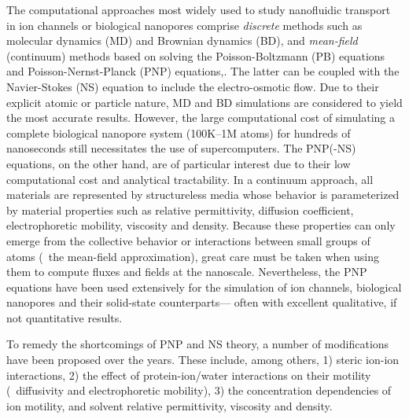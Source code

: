 \documentclass[journal=ancac3,manuscript=article,etalmode=truncate,maxauthors=0,layout=onecolumn]{achemso}
\begin{document}
The computational approaches most widely used to study nanofluidic transport in ion channels or biological
nanopores comprise \emph{discrete} methods such as molecular dynamics
(MD)\cite{Lynden-Bell-1996,Allen-1999,Aksimentiev-2005,Luan-2008,Bhattacharya-2011,Zhang-2014,DiMarino-2015,Belkin-2016}
and Brownian dynamics
(BD),\cite{Schirmer-1999,Im-2002,Noskov-2004,Millar-2008,Egwolf-2010,DeBiase-2015,Pederson-2015} and
\emph{mean-field} (continuum) methods based on solving the Poisson-Boltzmann (PB)
equations\cite{Grochowski-2008, Baldessari-2008-1} and Poisson-Nernst-Planck (PNP)
equations,\cite{Eisenberg-1996,Gillespie-2002, Simakov-2010}. The latter can be coupled with the Navier-Stokes
(NS) equation to include the electro-osmotic flow.\cite{Lu-2012,Pederson-2015} Due to their explicit atomic or
particle nature, MD and BD simulations are considered to yield the most accurate results. However, the large
computational cost of simulating a complete biological nanopore system (100K--1M atoms) for hundreds of
nanoseconds still necessitates the use of supercomputers.\cite{Aksimentiev-2005,Bhattacharya-2011} The
PNP(-NS) equations, on the other hand, are of particular interest due to their low computational cost and
analytical tractability. In a continuum approach, all materials are represented by structureless media whose
behavior is parameterized by material properties such as relative permittivity, diffusion coefficient,
electrophoretic mobility, viscosity and density. Because these properties can only emerge from the collective
behavior or interactions between small groups of atoms (\ie~the mean-field approximation), great care must be
taken when using them to compute fluxes and fields at the nanoscale.\cite{Corry-2000,Collins-2012}
Nevertheless, the PNP equations have been used extensively for the simulation of ion
channels,\cite{Im-2002,Furini-2006,Liu-2015} biological
nanopores\cite{Simakov-2010,Pederson-2015,Aguilella-Arzo-2017,Simakov-2018} and their solid-state
counterparts\cite{Cervera-2005,White-2008,Chaudhry-2014,Laohakunakorn-2015}--- often with excellent
qualitative, if not quantitative results.\cite{Maffeo-2012,Thomas-2014,Kim-2015}

To remedy the shortcomings of PNP and NS theory, a number of modifications have been proposed over the years.
These include, among others, 1) steric ion-ion interactions, 2) the effect of protein-ion/water interactions
on their motility (\ie~diffusivity and electrophoretic mobility), 3) the concentration dependencies of ion
motility, and solvent relative permittivity, viscosity and density.
\end{document}
